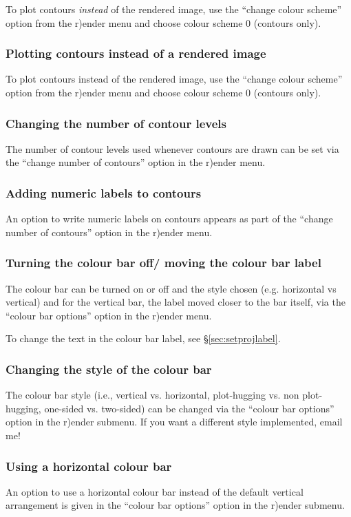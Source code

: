 \documentclass[a4paper,10pt]{article}
\begin{document}
 To plot contours \emph{instead} of the rendered image, use the ``change colour scheme'' option from the r)ender menu and choose colour scheme 0 (contours only). 

\subsubsection{ Plotting contours instead of a rendered image}
To plot contours instead of the rendered image, use the ``change colour scheme'' option from the r)ender menu and choose colour scheme 0 (contours only). 

\subsubsection{ Changing the number of contour levels}
 The number of contour levels used whenever contours are drawn can be set via the ``change number of contours'' option in the r)ender menu.

\subsubsection{ Adding numeric labels to contours}
 An option to write numeric labels on contours appears as part of the ``change number of contours'' option in the r)ender menu.

\subsubsection{ Turning the colour bar off/ moving the colour bar label}
 The colour bar can be turned on or off and the style chosen (e.g. horizontal vs vertical) and for the vertical bar, the label moved closer to the bar itself, via the ``colour bar options'' option in the r)ender menu.
 
 To change the text in the colour bar label, see \S\ref{sec:setprojlabel}.

\subsubsection{ Changing the style of the colour bar}
\label{sec:colourbarstyle}
 The colour bar style (i.e., vertical vs. horizontal, plot-hugging vs. non plot-hugging, one-sided vs. two-sided) can be changed via the ``colour bar options'' option in the r)ender submenu. If you want a different style implemented, email me!

\subsubsection{ Using a horizontal colour bar}
 An option to use a horizontal colour bar instead of the default vertical arrangement is given in the ``colour bar options'' option in the r)ender submenu.
\end{document}
